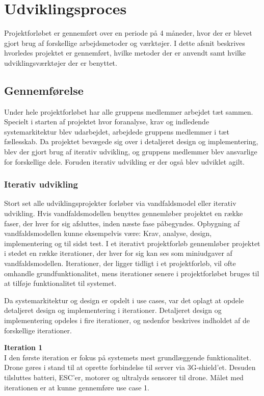 \section{Udviklingsproces}
Projektforløbet er gennemført over en periode på 4 måneder, hvor der er blevet gjort brug af forskellige arbejdsmetoder og værktøjer. I dette afsnit beskrives hvorledes projektet er gennemført, hvilke metoder der er anvendt samt hvilke udviklingsværktøjer der er benyttet.

\subsection{Gennemførelse}
Under hele projektforløbet har alle gruppens medlemmer arbejdet tæt sammen. Specielt i starten af projektet hvor foranalyse, krav og indledende systemarkitektur blev udarbejdet, arbejdede gruppens medlemmer i tæt fællesskab. 
Da projektet bevægede sig over i detaljeret design og implementering, blev der gjort brug af iterativ udvikling, og gruppens medlemmer blev ansvarlige for forskellige dele. Foruden iterativ udvikling er der også blev udviklet agilt.


\subsubsection{Iterativ udvikling}
Stort set alle udviklingsprojekter forløber via vandfaldsmodel eller iterativ udvikling. 
Hvis vandfaldsmodellen benyttes gennemløber projektet en række faser, der hver for sig afsluttes, inden næste fase påbegyndes. Opbygning af vandfaldsmodellen kunne eksempelvis være: Krav, analyse, design, implementering og til sidst test.
I et iterativt projektforløb gennemløber projektet i stedet en række iterationer, der hver for sig kan ses som miniudgaver af vandfaldsmodellen. Iterationer, der ligger tidligt i et projektforløb, vil ofte omhandle grundfunktionalitet, mens iterationer senere i projektforløbet bruges til at tilføje funktionalitet til systemet. 

\newpage 

Da systemarkitektur og design er opdelt i use cases, var det oplagt at opdele detaljeret design og implementering  i iterationer. Detaljeret design og implementering opdeles i fire iterationer, og nedenfor beskrives indholdet af de forskellige iterationer.  

\textbf{Iteration 1}\\
I den første iteration er fokus på systemets mest grundlæggende funktionalitet. 
Drone gøres i stand til at oprette forbindelse til server via 3G-shield'et.
Desuden tilsluttes batteri, ESC'er, motorer og ultralyds sensorer til drone. 
Målet med iterationen er at kunne gennemføre use case 1. 

